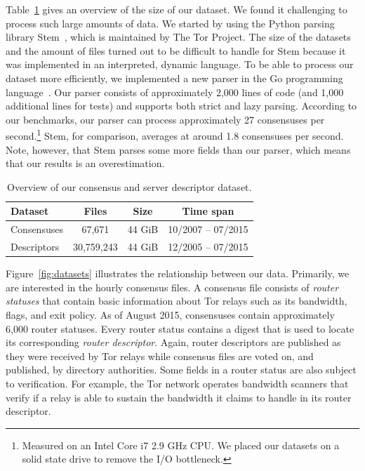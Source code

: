 Table~\ref{tab:collector-dataset} gives an overview of the size of our dataset.
We found it challenging to process such large amounts of data.  We started by
using the Python parsing library Stem~\cite{stem}, which is maintained by The
Tor Project.  The size of the datasets and the amount of files turned out to be
difficult to handle for Stem because it was implemented in an interpreted,
dynamic language.  To be able to process our dataset more efficiently, we
implemented a new parser in the Go programming language~\cite{zoossh}.  Our
parser consists of approximately 2,000 lines of code (and 1,000 additional lines
for tests) and supports both strict and lazy parsing.  According to our
benchmarks, our parser can process approximately 27 consensuses per
second.\footnote{Measured on an Intel Core i7 2.9 GHz CPU.  We placed our
datasets on a solid state drive to remove the I/O bottleneck.}  Stem, for
comparison, averages at around 1.8 consensuses per second.  Note, however, that
Stem parses some more fields than our parser, which means that our results is an
overestimation.

\begin{table}[t]
\centering
\begin{tabular}{l c c c}
\textbf{Dataset} & \textbf{Files} & \textbf{Size} & \textbf{Time span} \\
\hline
Consensuses & 67,671 & 44 GiB & 10/2007 -- 07/2015 \\
Descriptors & 30,759,243 & 44 GiB & 12/2005 -- 07/2015 \\
\end{tabular}
\caption{Overview of our consensus and server descriptor dataset.}
\label{tab:collector-dataset}
\end{table}

Figure~\ref{fig:datasets} illustrates the relationship between our data.
Primarily, we are interested in the hourly consensus files.  A consensus file
consists of \emph{router statuses} that contain basic information about Tor
relays such as its bandwidth, flags, and exit policy.  As of August 2015,
consensuses contain approximately 6,000 router statuses.  Every router status
contains a digest that is used to locate its corresponding \emph{router
descriptor}.  Again, router descriptors are published as they were received by
Tor relays while consensus files are voted on, and published, by directory
authorities.  Some fields in a router status are also subject to verification.
For example, the Tor network operates bandwidth scanners that verify if a relay
is able to sustain the bandwidth it claims to handle in its router descriptor.

